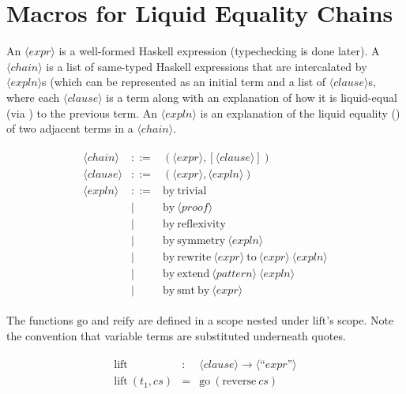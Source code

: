 \documentclass{article}
\newcommand{\var}[1]{\langle#1\rangle}
\newcommand{\kw}[1]{\text{#1}}
\newcommand{\code}[1]{\text{#1}}
\newcommand{\q}[1]{\text{``}#1\text{''}}
\begin{document}
\thispagestyle{empty}

\section{Macros for Liquid Equality Chains}

\noindent
An $\var{expr}$ is a well-formed Haskell expression (typechecking is done later).
A $\var{chain}$ is a list of same-typed Haskell expressions that are intercalated by $\var{expln}$s
(which can be represented as an initial term and a list of $\var{clause}$s, where each $\var{clause}$ is a term along with an explanation of how it is liquid-equal (via \code{EqualProp}) to the previous term.
An $\var{expln}$ is an explanation of the liquid equality (\code{EqualProp}) of two adjacent terms in a $\var{chain}$.

\begin{align*}
\begin{array}{rrl}
  \var{chain} &::=& (\var{expr}, [\var{clause}])
\\
  \var{clause} &::=& (\var{expr}, \var{expln})
\\
  \var{expln} &::=&
  \kw{by}~\kw{trivial} \\ &|&
  \kw{by}~\var{proof} \\ &|& 
  \kw{by}~\kw{reflexivity} \\ &|&
  \kw{by}~\kw{symmetry}~\var{expln} \\ &|&
  \kw{by}~\kw{rewrite}~\var{expr}~\kw{to}~\var{expr}~\var{expln} \\ &|&
  \kw{by}~\kw{extend}~\var{pattern}~\var{expln} \\ &|&
  \kw{by}~\kw{smt}~\kw{by}~\var{expr}
\end{array}
\end{align*}

\noindent
The functions $\code{go}$ and $\code{reify}$ are defined in a scope nested under $\code{lift}$'s scope.
Note the convention that variable terms are substituted underneath quotes.

\begin{align*}
\begin{array}{rrl}
\code{lift} &:& \var{clause} \to \var{\q{expr}}
\\
\code{lift}~(t_1, cs) &=& \code{go}~(\code{reverse}~cs)
\end{array}
\end{align*}
\end{document}
